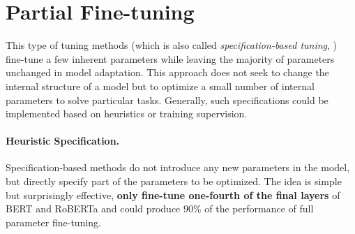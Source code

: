 \section{Partial Fine-tuning}
This type of tuning methods (which is also called \textit{specification-based tuning}, \citealp{DBLP:journals/corr/abs-2203-06904}) fine-tune a few inherent parameters while leaving the majority of parameters unchanged in model adaptation. This approach does not seek to change the internal structure of a model but to optimize a small number of internal parameters to solve particular tasks. Generally, such specifications could be implemented based on heuristics or training supervision. 

\paragraph{Heuristic Specification.}
Specification-based methods do not introduce any new parameters in the model, but directly specify part of the parameters to be optimized. The idea is simple but surprisingly effective, \citet{DBLP:journals/corr/abs-1911-03090} \textbf{only fine-tune one-fourth of the final layers} of BERT and RoBERTa and could produce $90\%$ of the performance of full parameter fine-tuning. 

